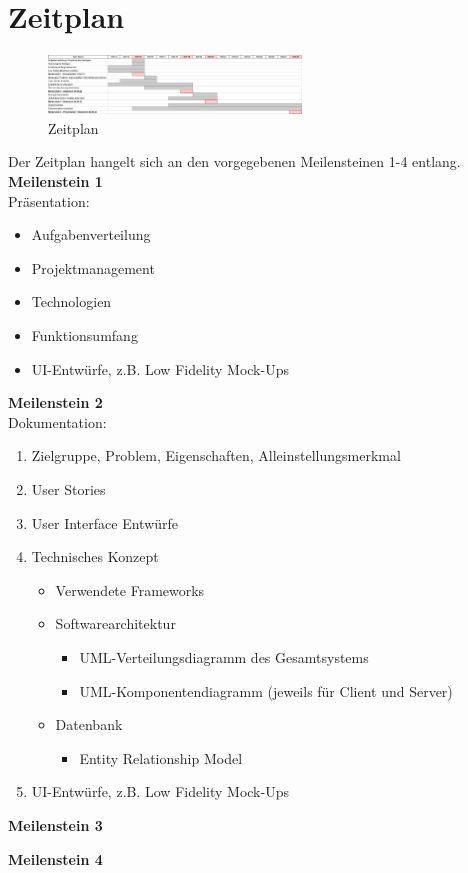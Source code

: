 \chapter*{Zeitplan}


\begin{figure}
    \centering
    \includegraphics[width=0.6\textwidth]{Zeitplan_DeskPlanner.png}
    \caption{Zeitplan}
    \label{fig:Zeitplan}
\end{figure}

Der Zeitplan hangelt sich an den vorgegebenen Meilensteinen 1-4 entlang.\\

\textbf{Meilenstein 1}\\
Präsentation:
\begin{itemize}
    \item Aufgabenverteilung
    \item Projektmanagement
    \item Technologien
    \item Funktionsumfang
    \item UI-Entwürfe, z.B. Low Fidelity Mock-Ups
\end{itemize}

\textbf{Meilenstein 2}\\
Dokumentation:
\begin{enumerate}
    \item Zielgruppe, Problem, Eigenschaften, Alleinstellungsmerkmal
    \item User Stories
    \item User Interface Entwürfe
    \item Technisches Konzept
    \begin{itemize}
        \item Verwendete Frameworks
        \item Softwarearchitektur
        \begin{itemize}
            \item UML-Verteilungsdiagramm des Gesamtsystems
            \item UML-Komponentendiagramm (jeweils für Client und Server)
        \end{itemize}
        \item Datenbank
        \begin{itemize}
            \item Entity Relationship Model
        \end{itemize}
    \end{itemize}
    \item UI-Entwürfe, z.B. Low Fidelity Mock-Ups
\end{enumerate}

\textbf{Meilenstein 3}

\textbf{Meilenstein 4}